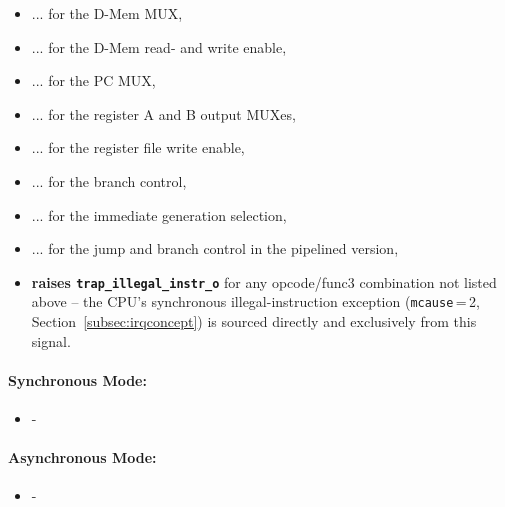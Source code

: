 \begin{itemize}
  \item ... for the D-Mem MUX,
  \item ... for the D-Mem read- and write enable,
  \item ... for the PC MUX,
  \item ... for the register A and B output MUXes,
  \item ... for the register file write enable,
  \item ... for the branch control,
  \item ... for the immediate generation selection,
  \item ... for the jump and branch control in the pipelined version,
  \item \textbf{raises \texttt{trap\_illegal\_instr\_o}} for any opcode/func3
    combination not listed above -- the CPU's synchronous illegal-instruction
    exception (\texttt{mcause}\,=\,2, Section~\ref{subsec:irqconcept}) is
    sourced directly and exclusively from this signal.
\end{itemize}

\paragraph{Synchronous Mode: }
\begin{itemize}
  \item -
\end{itemize}

\paragraph{Asynchronous Mode: }
\begin{itemize}
  \item -
\end{itemize}
